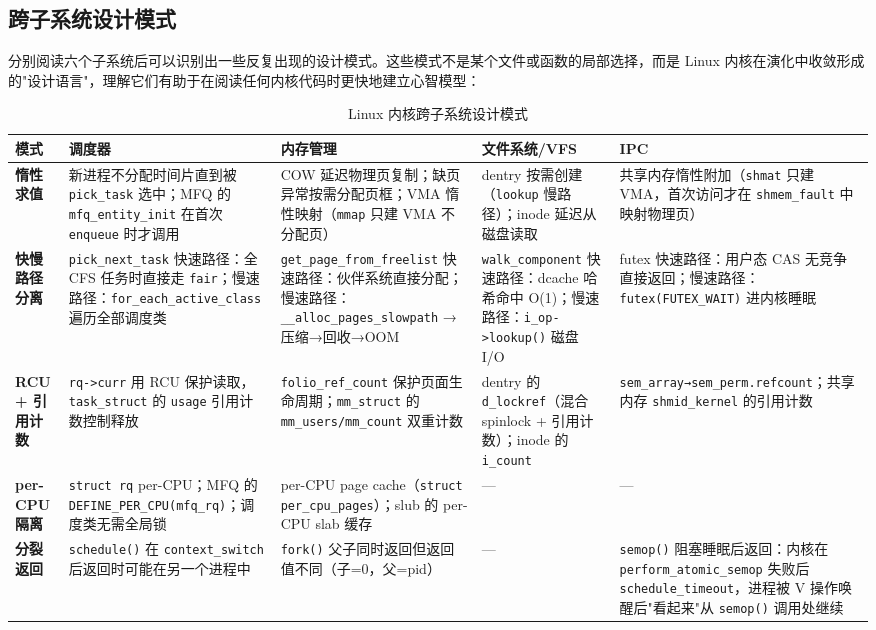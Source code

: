 \documentclass[a4paper]{article}
\begin{document}
\subsection{跨子系统设计模式}

分别阅读六个子系统后可以识别出一些反复出现的设计模式。这些模式不是某个文件或函数的局部选择，而是 Linux 内核在演化中收敛形成的"设计语言"，理解它们有助于在阅读任何内核代码时更快地建立心智模型：

\begin{table}[htbp]
\centering
\footnotesize
\caption{Linux 内核跨子系统设计模式}
\label{tab:design_patterns}
\begin{tabular}{p{2cm}p{3cm}p{3cm}p{3cm}p{2.5cm}}
\toprule
\textbf{模式} & \textbf{调度器} & \textbf{内存管理} & \textbf{文件系统/VFS} & \textbf{IPC} \\
\midrule
\textbf{惰性求值} & 新进程不分配时间片直到被 \texttt{pick\_task} 选中；MFQ 的 \texttt{mfq\_entity\_init} 在首次 \texttt{enqueue} 时才调用 & COW 延迟物理页复制；缺页异常按需分配页框；VMA 惰性映射（\texttt{mmap} 只建 VMA 不分配页） & dentry 按需创建（\texttt{lookup} 慢路径）；inode 延迟从磁盘读取 & 共享内存惰性附加（\texttt{shmat} 只建 VMA，首次访问才在 \texttt{shmem\_fault} 中映射物理页）\\
\midrule
\textbf{快慢路径分离} & \texttt{pick\_next\_task} 快速路径：全 CFS 任务时直接走 \texttt{fair}；慢速路径：\texttt{for\_each\_active\_class} 遍历全部调度类 & \texttt{get\_page\_from\_freelist} 快速路径：伙伴系统直接分配；慢速路径：\texttt{\_\_alloc\_pages\_slowpath} → 压缩→回收→OOM & \texttt{walk\_component} 快速路径：dcache 哈希命中 O(1)；慢速路径：\texttt{i\_op->lookup()} 磁盘 I/O & futex 快速路径：用户态 CAS 无竞争直接返回；慢速路径：\texttt{futex(FUTEX\_WAIT)} 进内核睡眠 \\
\midrule
\textbf{RCU + 引用计数} & \texttt{rq->curr} 用 RCU 保护读取，\texttt{task\_struct} 的 \texttt{usage} 引用计数控制释放 & \texttt{folio\_ref\_count} 保护页面生命周期；\texttt{mm\_struct} 的 \texttt{mm\_users/mm\_count} 双重计数 & dentry 的 \texttt{d\_lockref}（混合 spinlock + 引用计数）；inode 的 \texttt{i\_count} & \texttt{sem\_array→sem\_perm.refcount}；共享内存 \texttt{shmid\_kernel} 的引用计数 \\
\midrule
\textbf{per-CPU 隔离} & \texttt{struct rq} per-CPU；MFQ 的 \texttt{DEFINE\_PER\_CPU(mfq\_rq)}；调度类无需全局锁 & per-CPU page cache（\texttt{struct per\_cpu\_pages}）；slub 的 per-CPU  slab 缓存 & — & — \\
\midrule
\textbf{分裂返回} & \texttt{schedule()} 在 \texttt{context\_switch} 后返回时可能在另一个进程中 & \texttt{fork()} 父子同时返回但返回值不同（子=0，父=pid） & — & \texttt{semop()} 阻塞睡眠后返回：内核在 \texttt{perform\_atomic\_semop} 失败后 \texttt{schedule\_timeout}，进程被 V 操作唤醒后"看起来"从 \texttt{semop()} 调用处继续 \\
\bottomrule
\end{tabular}
\end{table}
\end{document}
